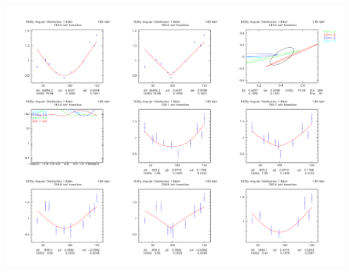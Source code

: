 \begin{center}
\includegraphics[page=12,angle=90,width=0.95\textwidth]{162Dy_adlegpol_16_2.pdf}
\end{center}
